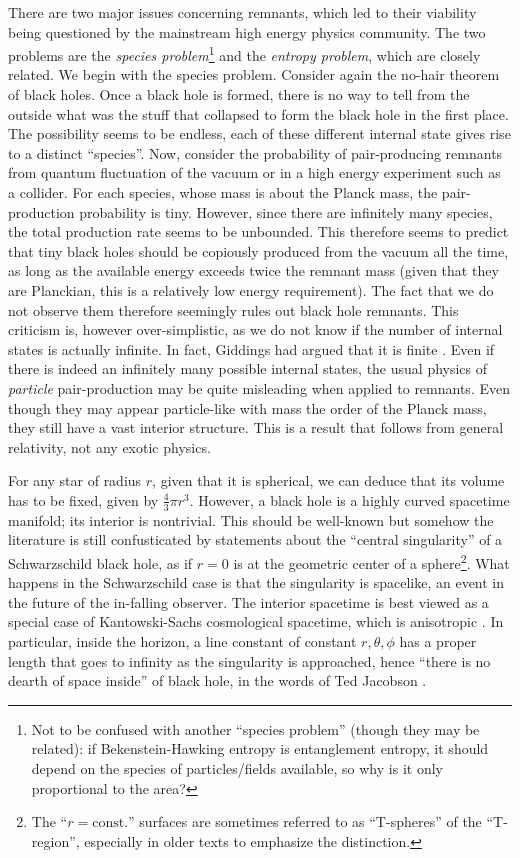 \documentclass[12pt,preprintnumbers, floatfix, preprintnumbers, letterpaper, superscriptaddress,nofootinbib]{revtex4-2}
\begin{document}
There are two major issues concerning remnants, which led to their viability being questioned by the mainstream high energy physics community. The two problems are the \emph{species problem}\footnote{Not to be confused with another ``species problem'' \cite{9409015,1206.2365} (though they may be related): if Bekenstein-Hawking entropy is entanglement entropy, it should depend on the species of particles/fields available, so why is it only proportional to the area?} and the \emph{entropy problem}, which are closely related. We begin with the species problem. Consider again the no-hair theorem of black holes. Once a black hole is formed, there is no way to tell from the outside what was the stuff that collapsed to form the black hole in the first place. The possibility seems to be endless, each of these different internal state gives rise to a distinct ``species''. Now, consider the probability of pair-producing remnants from quantum fluctuation of the vacuum or in a high energy experiment such as a collider. For each species, whose mass is about the Planck mass, the pair-production probability is tiny. However, since there are infinitely many species, the total production rate seems to be unbounded. This therefore seems to predict that tiny black holes should be copiously produced from the vacuum all the time, as long as the available energy exceeds twice the remnant mass (given that they are Planckian, this is a relatively low energy requirement). The fact that we do not observe them therefore seemingly rules out black hole remnants. This criticism is, however over-simplistic, as we do not know if the number of internal states is actually infinite. In fact, Giddings had argued that it is finite \cite{9310101,9412159}. Even if there is indeed an infinitely many possible internal states, the usual physics of \emph{particle} pair-production may be quite misleading when applied to remnants. Even though they may appear particle-like with mass the order of the Planck mass, they still have a vast interior structure. This is a result that follows from general relativity, not any exotic physics. 

For any star of radius $r$, given that it is spherical, we can deduce that its volume has to be fixed, given by $\frac{4}{3}\pi r^3$. However, a black hole is a highly curved spacetime manifold; its interior is nontrivial. This should be well-known but somehow the literature is still confusticated by statements about the ``central singularity'' of a Schwarzschild black hole, as if $r=0$ is at the geometric center of a sphere\footnote{The ``$r=\text{const.}$'' surfaces are sometimes referred to as ``T-spheres'' of the ``T-region'', especially in older texts \cite{ruban} to emphasize the distinction.}. What happens in the Schwarzschild case is that the singularity is spacelike, an event in the future of the in-falling observer. The interior spacetime is best viewed as a special case of Kantowski-Sachs cosmological spacetime, which is anisotropic \cite{0609042, brehme}. In particular, inside the horizon, a line constant of constant $r, \theta, \phi$ has a proper length that goes to infinity as the singularity is approached, hence ``there is no dearth of space inside'' of black hole, in the words of Ted Jacobson \cite{0308048}.
\end{document}
